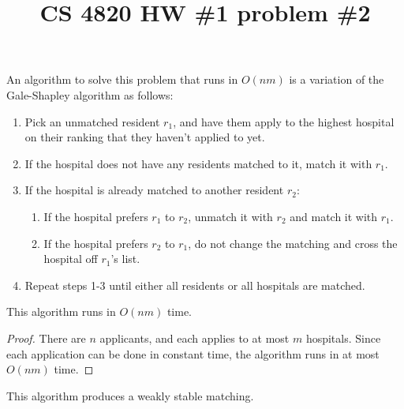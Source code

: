 
\usepackage[utf8]{inputenc}
\usepackage[english]{babel}
\usepackage{amsthm}

\title{CS 4820 HW \#1 problem \#2}
\maketitle

 An algorithm to solve this problem that runs in $O(nm)$ is a variation of the Gale-Shapley algorithm as follows:

\begin{enumerate}
  	\item Pick an unmatched resident $r_1$, and have them apply to the highest hospital on their ranking that they haven't applied to yet.
	\item If the hospital does not have any residents matched to it, match it with $r_1$.
	\item If the hospital is already matched to another resident $r_2$:
	\begin{enumerate}
  		\item If the hospital prefers $r_1$ to $r_2$, unmatch it with $r_2$ and match it with $r_1$.
		\item If the hospital prefers $r_2$ to $r_1$, do not change the matching and cross the hospital off $r_1$'s list.
	\end{enumerate}
	\item Repeat steps 1-3 until either all residents or all hospitals are matched.
\end{enumerate}


\begin{lemma}
	This algorithm runs in $O(nm)$ time.
\end{lemma}

\begin{proof}
	There are $n$ applicants, and each applies to at most $m$ hospitals. Since each application can be done in constant time, the algorithm runs in at most $O(nm)$ time.
\end{proof}

\begin{lemma}
	This algorithm produces a weakly stable matching.
\end{lemma}

